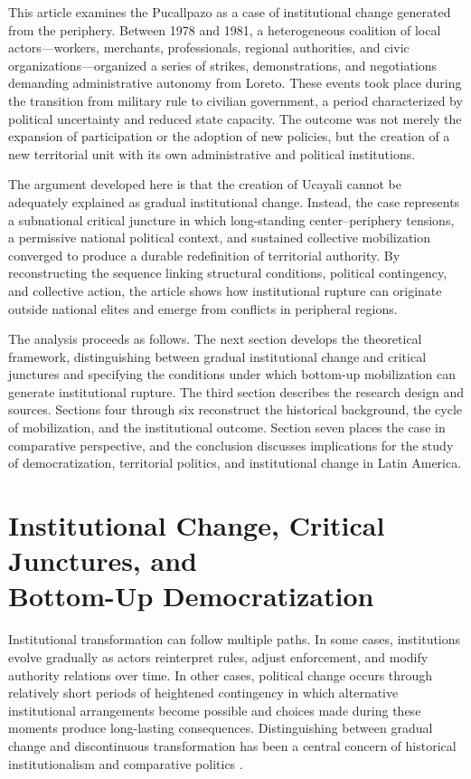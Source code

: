 \documentclass[12pt]{article}
\begin{document}
This article examines the Pucallpazo as a case of institutional change
generated from the periphery. Between 1978 and 1981, a heterogeneous
coalition of local actors---workers, merchants, professionals, regional
authorities, and civic organizations---organized a series of strikes,
demonstrations, and negotiations demanding administrative autonomy from
Loreto. These events took place during the transition from military rule
to civilian government, a period characterized by political uncertainty
and reduced state capacity. The outcome was not merely the expansion of
participation or the adoption of new policies, but the creation of a new
territorial unit with its own administrative and political institutions.

The argument developed here is that the creation of Ucayali cannot be
adequately explained as gradual institutional change. Instead, the case
represents a subnational critical juncture in which long-standing
center--periphery tensions, a permissive national political context,
and sustained collective mobilization converged to produce a durable
redefinition of territorial authority. By reconstructing the sequence
linking structural conditions, political contingency, and collective
action, the article shows how institutional rupture can originate outside
national elites and emerge from conflicts in peripheral regions.

The analysis proceeds as follows. The next section develops the
theoretical framework, distinguishing between gradual institutional
change and critical junctures and specifying the conditions under which
bottom-up mobilization can generate institutional rupture. The third
section describes the research design and sources. Sections four through
six reconstruct the historical background, the cycle of mobilization,
and the institutional outcome. Section seven places the case in
comparative perspective, and the conclusion discusses implications for
the study of democratization, territorial politics, and institutional
change in Latin America.

\section{Institutional Change, Critical Junctures, and\\
Bottom-Up Democratization}

Institutional transformation can follow multiple paths. In some cases,
institutions evolve gradually as actors reinterpret rules, adjust
enforcement, and modify authority relations over time. In other cases,
political change occurs through relatively short periods of heightened
contingency in which alternative institutional arrangements become
possible and choices made during these moments produce long-lasting
consequences. Distinguishing between gradual change and discontinuous
transformation has been a central concern of historical institutionalism
and comparative politics
\autocite{streeck_introduction_2005,mahoney_explaining_2010,capoccia_study_2007}.
\end{document}
